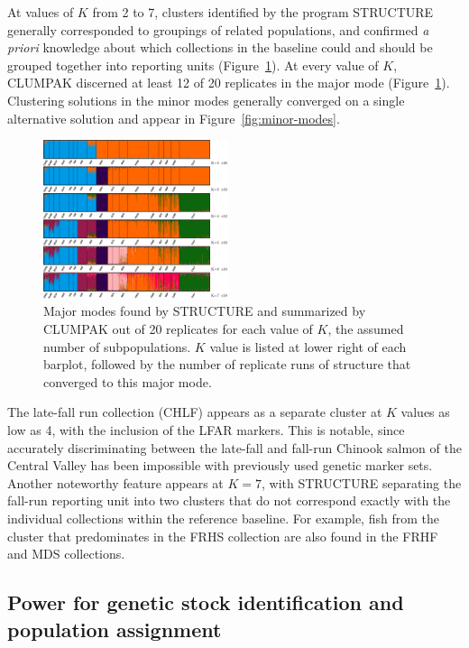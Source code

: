 At values of $K$ from 2 to 7, clusters identified by the program STRUCTURE
generally corresponded to groupings of related populations, and confirmed
{\em a priori} knowledge about which collections in the baseline could and should be
grouped together into reporting units (Figure~\ref{fig:struct}).  At every value of $K$, CLUMPAK discerned at least
12 of 20 replicates in the major mode (Figure~\ref{fig:struct}).   
Clustering solutions in the minor
modes generally converged on a single alternative solution and appear in Figure~\ref{fig:minor-modes}.
\begin{figure}
\newcommand{\structcap}{\footnotesize Major modes found by STRUCTURE and summarized
by CLUMPAK out of 20 replicates for each value of $K$, the assumed number of
subpopulations. $K$ value is listed at lower right of each barplot, followed by the number
of replicate runs of structure that converged to this major mode.}
\begin{center}
\includegraphics[width=0.48\textwidth]{images/clumpak-crop.pdf}
\end{center}
\caption[\structcap]{\structcap}
\label{fig:struct}
\end{figure}
The late-fall run collection (CHLF) appears as a separate cluster at $K$ values
as low as 4, with the inclusion of the LFAR markers.  This is notable, since accurately discriminating between the late-fall and
fall-run Chinook salmon of the Central Valley has been impossible with previously used genetic marker sets.
Another noteworthy feature appears at $K=7$, with STRUCTURE separating the fall-run reporting unit
into two clusters that do not correspond exactly with the individual
collections within the reference baseline. For example, fish from the
cluster that predominates in the FRHS collection are also found in the FRHF and MDS collections.


\subsection*{Power for genetic stock identification and population assignment}

